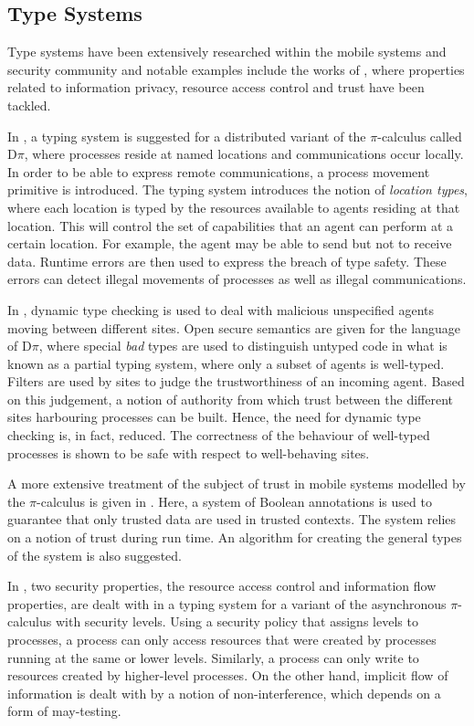 \documentclass[10pt,a4paper,final,oneside,fleqn]{book}
\begin{document}
\subsection{Type Systems}
Type systems have been extensively researched within the mobile systems and security community and notable examples include the works of \cite{abadi3,hennessy3,riely1,cardelli2,hennessy2,honda1,hepburn1}, where properties related to information privacy, resource access control and trust have been tackled.

In \cite{hennessy3}, a typing system is suggested for a distributed variant of the $\pi$-calculus called $\mbox{D}\pi$, where processes reside at named locations and communications occur locally.  In order to be able to express remote communications, a process movement primitive is introduced.  The typing system introduces the notion of {\itshape location types\/}, where each location is typed by the resources available to agents residing at that location.  This will control the set of capabilities that an agent can perform at a certain location.  For example, the agent may be able to send but not to receive data.  Runtime errors are then used to express the breach of type safety.  These errors can detect illegal movements of processes as well as illegal communications.

In \cite{riely1}, dynamic type checking is used to deal with malicious unspecified agents moving between different sites.  Open secure semantics are given for the language of $\mbox{D}\pi$, where special {\itshape bad\/} types are used to distinguish untyped code in what is known as a partial typing system, where only a subset of agents is well-typed.  Filters are used by sites to judge the trustworthiness of an incoming agent.  Based on this judgement, a notion of authority from which trust between the different sites harbouring processes can be built.  Hence, the need for dynamic type checking is, in fact, reduced.  The correctness of the behaviour of well-typed processes is shown to be safe with respect to well-behaving sites.

A more extensive treatment of the subject of trust in mobile systems modelled by the $\pi$-calculus is given in \cite{hepburn1}.  Here, a system of Boolean annotations is used to guarantee that only trusted data are used in trusted contexts.  The system relies on a notion of trust during run time.  An algorithm for creating the general types of the system is also suggested.

In \cite{hennessy2}, two security properties, the resource access control and information flow properties, are dealt with in a typing system for a variant of the asynchronous $\pi$-calculus \cite{boudol1,honda2} with security levels.  Using a security policy that assigns levels to processes, a process can only access resources that were created by processes running at the same or lower levels.  Similarly, a process can only write to resources created by higher-level processes.  On the other hand, implicit flow of information is dealt with by a notion of non-interference, which depends on a form of may-testing.
\end{document}
